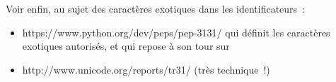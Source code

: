     Voir enfin, au sujet des caractères exotiques dans les identificateurs~:

\begin{itemize}
\tightlist
\item
  https://www.python.org/dev/peps/pep-3131/ qui définit les caractères
  exotiques autorisés, et qui repose à son tour sur
\item
  http://www.unicode.org/reports/tr31/ (très technique~!)
\end{itemize}


    
    
    
